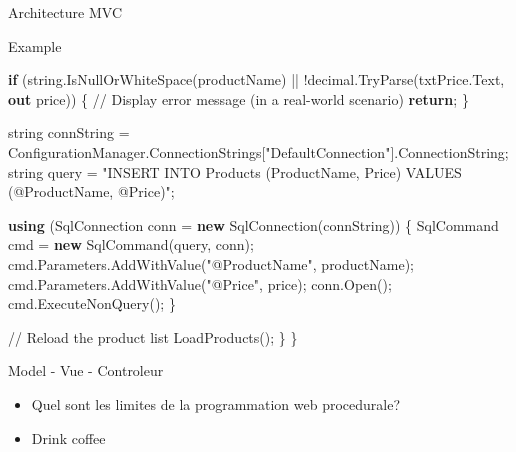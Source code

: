 \documentclass[
  ignorenonframetext,
]{beamer}
\newenvironment{Shaded}{\begin{snugshade}}{\end{snugshade}}
\newcommand{\CommentTok}[1]{\textcolor[rgb]{0.37,0.37,0.37}{#1}}
\newcommand{\DataTypeTok}[1]{\textcolor[rgb]{0.68,0.00,0.00}{#1}}
\newcommand{\FunctionTok}[1]{\textcolor[rgb]{0.28,0.35,0.67}{#1}}
\newcommand{\KeywordTok}[1]{\textcolor[rgb]{0.00,0.23,0.31}{\textbf{#1}}}
\newcommand{\NormalTok}[1]{\textcolor[rgb]{0.00,0.23,0.31}{#1}}
\newcommand{\OperatorTok}[1]{\textcolor[rgb]{0.37,0.37,0.37}{#1}}
\newcommand{\StringTok}[1]{\textcolor[rgb]{0.13,0.47,0.30}{#1}}
\providecommand{\tightlist}{%
  \setlength{\itemsep}{0pt}\setlength{\parskip}{0pt}}\usepackage{longtable,booktabs,array}
\begin{document}
\begin{frame}[fragile]{Architecture MVC}
\begin{block}{Example}
\begin{Shaded}
\begin{Highlighting}[]
        \KeywordTok{if} \OperatorTok{(}\DataTypeTok{string}\OperatorTok{.}\FunctionTok{IsNullOrWhiteSpace}\OperatorTok{(}\NormalTok{productName}\OperatorTok{)} \OperatorTok{||} \OperatorTok{!}\DataTypeTok{decimal}\OperatorTok{.}\FunctionTok{TryParse}\OperatorTok{(}\NormalTok{txtPrice}\OperatorTok{.}\FunctionTok{Text}\OperatorTok{,} \KeywordTok{out}\NormalTok{ price}\OperatorTok{))}
        \OperatorTok{\{}
            \CommentTok{// Display error message (in a real{-}world scenario)}
            \KeywordTok{return}\OperatorTok{;}
        \OperatorTok{\}}

        \DataTypeTok{string}\NormalTok{ connString }\OperatorTok{=}\NormalTok{ ConfigurationManager}\OperatorTok{.}\FunctionTok{ConnectionStrings}\OperatorTok{[}\StringTok{"DefaultConnection"}\OperatorTok{].}\FunctionTok{ConnectionString}\OperatorTok{;}
        \DataTypeTok{string}\NormalTok{ query }\OperatorTok{=} \StringTok{"INSERT INTO Products (ProductName, Price) VALUES (@ProductName, @Price)"}\OperatorTok{;}

        \KeywordTok{using} \OperatorTok{(}\NormalTok{SqlConnection conn }\OperatorTok{=} \KeywordTok{new} \FunctionTok{SqlConnection}\OperatorTok{(}\NormalTok{connString}\OperatorTok{))}
        \OperatorTok{\{}
\NormalTok{            SqlCommand cmd }\OperatorTok{=} \KeywordTok{new} \FunctionTok{SqlCommand}\OperatorTok{(}\NormalTok{query}\OperatorTok{,}\NormalTok{ conn}\OperatorTok{);}
\NormalTok{            cmd}\OperatorTok{.}\FunctionTok{Parameters}\OperatorTok{.}\FunctionTok{AddWithValue}\OperatorTok{(}\StringTok{"@ProductName"}\OperatorTok{,}\NormalTok{ productName}\OperatorTok{);}
\NormalTok{            cmd}\OperatorTok{.}\FunctionTok{Parameters}\OperatorTok{.}\FunctionTok{AddWithValue}\OperatorTok{(}\StringTok{"@Price"}\OperatorTok{,}\NormalTok{ price}\OperatorTok{);}
\NormalTok{            conn}\OperatorTok{.}\FunctionTok{Open}\OperatorTok{();}
\NormalTok{            cmd}\OperatorTok{.}\FunctionTok{ExecuteNonQuery}\OperatorTok{();}
        \OperatorTok{\}}

        \CommentTok{// Reload the product list}
        \FunctionTok{LoadProducts}\OperatorTok{();}
    \OperatorTok{\}}
\OperatorTok{\}}
\end{Highlighting}
\end{Shaded}
\end{block}

\begin{block}{Model - Vue - Controleur}
\label{model---vue---controleur}
\begin{itemize}
\tightlist
\item
  Quel sont les limites de la programmation web procedurale?
\item
  Drink coffee
\end{itemize}
\end{block}
\end{frame}
\end{document}
